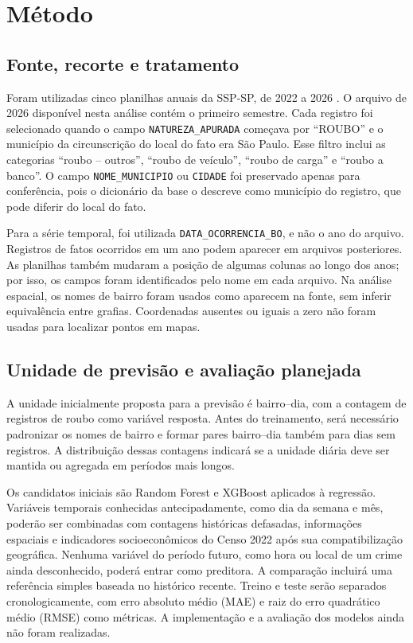 \documentclass[12pt]{article}
\begin{document}
\section{Método}

\subsection{Fonte, recorte e tratamento}

Foram utilizadas cinco planilhas anuais da SSP-SP, de 2022 a 2026 \cite{ssp}. O arquivo de 2026 disponível nesta análise contém o primeiro semestre. Cada registro foi selecionado quando o campo \texttt{NATUREZA\_APURADA} começava por ``ROUBO'' e o município da circunscrição do local do fato era São Paulo. Esse filtro inclui as categorias ``roubo -- outros'', ``roubo de veículo'', ``roubo de carga'' e ``roubo a banco''. O campo \texttt{NOME\_MUNICIPIO} ou \texttt{CIDADE} foi preservado apenas para conferência, pois o dicionário da base o descreve como município do registro, que pode diferir do local do fato.

Para a série temporal, foi utilizada \texttt{DATA\_OCORRENCIA\_BO}, e não o ano do arquivo. Registros de fatos ocorridos em um ano podem aparecer em arquivos posteriores. As planilhas também mudaram a posição de algumas colunas ao longo dos anos; por isso, os campos foram identificados pelo nome em cada arquivo. Na análise espacial, os nomes de bairro foram usados como aparecem na fonte, sem inferir equivalência entre grafias. Coordenadas ausentes ou iguais a zero não foram usadas para localizar pontos em mapas.

\subsection{Unidade de previsão e avaliação planejada}

A unidade inicialmente proposta para a previsão é bairro--dia, com a contagem de registros de roubo como variável resposta. Antes do treinamento, será necessário padronizar os nomes de bairro e formar pares bairro--dia também para dias sem registros. A distribuição dessas contagens indicará se a unidade diária deve ser mantida ou agregada em períodos mais longos.

Os candidatos iniciais são Random Forest e XGBoost aplicados à regressão. Variáveis temporais conhecidas antecipadamente, como dia da semana e mês, poderão ser combinadas com contagens históricas defasadas, informações espaciais e indicadores socioeconômicos do Censo 2022 após sua compatibilização geográfica. Nenhuma variável do período futuro, como hora ou local de um crime ainda desconhecido, poderá entrar como preditora. A comparação incluirá uma referência simples baseada no histórico recente. Treino e teste serão separados cronologicamente, com erro absoluto médio (MAE) e raiz do erro quadrático médio (RMSE) como métricas. A implementação e a avaliação dos modelos ainda não foram realizadas.
\end{document}
